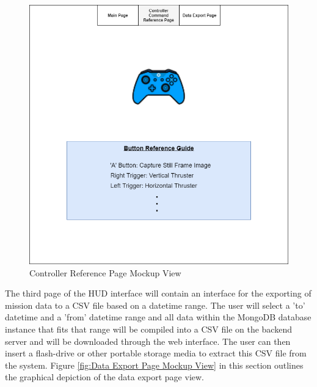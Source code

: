 \documentclass{scrreprt}
\begin{document}
\begin{figure}[!ht]
    \centering
    \includegraphics[scale=0.45]{ControllerReferencePageMockup.png}
    \caption{Controller Reference Page Mockup View}
    \label{fig:Controller Reference Page Mockup View}
\end{figure}
\FloatBarrier

The third page of the HUD interface will contain an interface for the exporting of mission data to a CSV file based on a datetime range. The user will select a 'to' datetime and a 'from' datetime range and all data within the MongoDB database instance that fits that range will be compiled into a CSV file on the backend server and will be downloaded through the web interface. The user can then insert a flash-drive or other portable storage media to extract this CSV file from the system. Figure \ref{fig:Data Export Page Mockup View} in this section outlines the graphical depiction of the data export page view.
\end{document}

